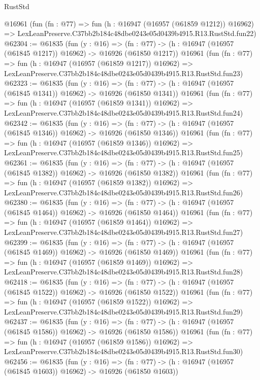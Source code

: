\begin{lexlean}{RustStd}
\begin{coremodule}
    @16961
    (fun (fn : @77) =>
    fun (h : @16947 (@16957 (@61859 @1212)) @16962) =>
    LexLeanPreserve.C37bb2b184c48dbe0243e05d0439b4915.R13.RustStd.fun22)
@62304 := @61835
    (fun (y : @16) =>
    (fn : @77) -> (h : @16947 (@16957 (@61845 @1217)) @16962) -> @16926 (@61850 @1217))
    @16961
    (fun (fn : @77) =>
    fun (h : @16947 (@16957 (@61859 @1217)) @16962) =>
    LexLeanPreserve.C37bb2b184c48dbe0243e05d0439b4915.R13.RustStd.fun23)
@62323 := @61835
    (fun (y : @16) =>
    (fn : @77) -> (h : @16947 (@16957 (@61845 @1341)) @16962) -> @16926 (@61850 @1341))
    @16961
    (fun (fn : @77) =>
    fun (h : @16947 (@16957 (@61859 @1341)) @16962) =>
    LexLeanPreserve.C37bb2b184c48dbe0243e05d0439b4915.R13.RustStd.fun24)
@62342 := @61835
    (fun (y : @16) =>
    (fn : @77) -> (h : @16947 (@16957 (@61845 @1346)) @16962) -> @16926 (@61850 @1346))
    @16961
    (fun (fn : @77) =>
    fun (h : @16947 (@16957 (@61859 @1346)) @16962) =>
    LexLeanPreserve.C37bb2b184c48dbe0243e05d0439b4915.R13.RustStd.fun25)
@62361 := @61835
    (fun (y : @16) =>
    (fn : @77) -> (h : @16947 (@16957 (@61845 @1382)) @16962) -> @16926 (@61850 @1382))
    @16961
    (fun (fn : @77) =>
    fun (h : @16947 (@16957 (@61859 @1382)) @16962) =>
    LexLeanPreserve.C37bb2b184c48dbe0243e05d0439b4915.R13.RustStd.fun26)
@62380 := @61835
    (fun (y : @16) =>
    (fn : @77) -> (h : @16947 (@16957 (@61845 @1464)) @16962) -> @16926 (@61850 @1464))
    @16961
    (fun (fn : @77) =>
    fun (h : @16947 (@16957 (@61859 @1464)) @16962) =>
    LexLeanPreserve.C37bb2b184c48dbe0243e05d0439b4915.R13.RustStd.fun27)
@62399 := @61835
    (fun (y : @16) =>
    (fn : @77) -> (h : @16947 (@16957 (@61845 @1469)) @16962) -> @16926 (@61850 @1469))
    @16961
    (fun (fn : @77) =>
    fun (h : @16947 (@16957 (@61859 @1469)) @16962) =>
    LexLeanPreserve.C37bb2b184c48dbe0243e05d0439b4915.R13.RustStd.fun28)
@62418 := @61835
    (fun (y : @16) =>
    (fn : @77) -> (h : @16947 (@16957 (@61845 @1522)) @16962) -> @16926 (@61850 @1522))
    @16961
    (fun (fn : @77) =>
    fun (h : @16947 (@16957 (@61859 @1522)) @16962) =>
    LexLeanPreserve.C37bb2b184c48dbe0243e05d0439b4915.R13.RustStd.fun29)
@62437 := @61835
    (fun (y : @16) =>
    (fn : @77) -> (h : @16947 (@16957 (@61845 @1586)) @16962) -> @16926 (@61850 @1586))
    @16961
    (fun (fn : @77) =>
    fun (h : @16947 (@16957 (@61859 @1586)) @16962) =>
    LexLeanPreserve.C37bb2b184c48dbe0243e05d0439b4915.R13.RustStd.fun30)
@62456 := @61835
    (fun (y : @16) =>
    (fn : @77) -> (h : @16947 (@16957 (@61845 @1603)) @16962) -> @16926 (@61850 @1603))

\end{coremodule}
\end{lexlean}
